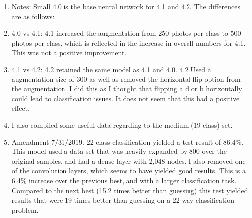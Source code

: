 \documentclass[12pt]{article} %
\begin{document}
\begin{enumerate}[label = (\roman*)]
\item Notes: Small 4.0 is the base neural network for 4.1 and 4.2. The differences are as follows: 
\item 4.0 vs 4.1: 4.1 increased the augmentation from 250 photos per class to 500 photos per class, which is reflected in the increase in overall numbers for 4.1. This was not a positive improvement.
\item 4.1 vs 4.2: 4.2 retained the same model as 4.1 and 4.0. 4.2 Used a augmentation size of 300 as well as removed the horizontal flip option from the augmentation. I did this as I thought that flipping a d or b horizontally could lead to classification issues. It does not seem that this had a positive effect. 
\item I also compiled some useful data regarding to the medium (19 class) set.
\item Amendment 7/31/2019. 22 class classification yielded a test result of 86.4\%. This model used a data set that was heavily expanded by 800 over the original samples, and had a dense layer with 2,048 nodes. I also removed one of the convolution layers, which seems to have yielded good results. This is a 6.4\% increase over the previous best, and with a larger classification task. Compared to the next best (15.2 times better than guessing) this test yielded results that were 19 times better than guessing on a 22 way classification problem.


\end{enumerate}
\end{document}

